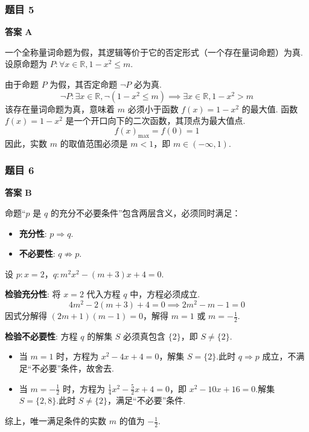 \subsubsection*{题目 5}
\begin{solution}
	\textbf{答案 A}
	
	一个全称量词命题为假，其逻辑等价于它的否定形式（一个存在量词命题）为真.
	设原命题为 $P: \forall x \in \mathbb{R}, 1-x^2 \le m$.
	
	由于命题 $P$ 为假，其否定命题 $\neg P$ 必为真.
	\[ \neg P: \exists x \in \mathbb{R}, \neg(1-x^2 \le m) \implies \exists x \in \mathbb{R}, 1-x^2 > m \]
	该存在量词命题为真，意味着 $m$ 必须小于函数 $f(x) = 1-x^2$ 的最大值.
	函数 $f(x)=1-x^2$ 是一个开口向下的二次函数，其顶点为最大值点.
	\[ f(x)_{\max} = f(0) = 1 \]
	因此，实数 $m$ 的取值范围必须是 $m < 1$，即 $m \in (-\infty, 1)$.
\end{solution}

\subsubsection*{题目 6}
\begin{solution}
	\textbf{答案 B}
	
	命题“$p$ 是 $q$ 的充分不必要条件”包含两层含义，必须同时满足：
	\begin{itemize}
		\item \textbf{充分性}: $p \Rightarrow q$.
		\item \textbf{不必要性}: $q \not\Rightarrow p$.
	\end{itemize}
	设 $p: x=2$，$q: m^2x^2 - (m+3)x + 4 = 0$.
	
	\textbf{检验充分性}:
	将 $x=2$ 代入方程 $q$ 中，方程必须成立.
	\[ 4m^2 - 2(m+3) + 4 = 0 \implies 2m^2 - m - 1 = 0 \]
	因式分解得 $(2m+1)(m-1) = 0$，解得 $m=1$ 或 $m=-\frac{1}{2}$.
	
	\textbf{检验不必要性}:
	方程 $q$ 的解集 $S$ 必须真包含 $\{2\}$，即 $S \neq \{2\}$.
	\begin{itemize}
		\item 当 $m=1$ 时，方程为 $x^2 - 4x + 4 = 0$，解集 $S=\{2\}$.此时 $q \Rightarrow p$ 成立，不满足“不必要”条件，故舍去.
		\item 当 $m=-\frac{1}{2}$ 时，方程为 $\frac{1}{4}x^2 - \frac{5}{2}x + 4 = 0$，即 $x^2 - 10x + 16 = 0$.解集 $S=\{2, 8\}$.此时 $S \neq \{2\}$，满足“不必要”条件.
	\end{itemize}
	综上，唯一满足条件的实数 $m$ 的值为 $-\frac{1}{2}$.
\end{solution}

